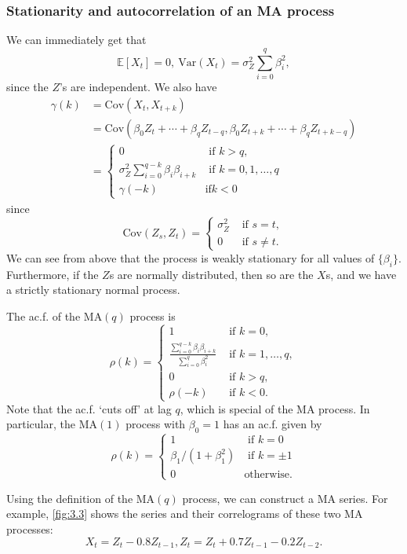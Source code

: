\subsubsection{Stationarity and autocorrelation of an MA process}
We can immediately get that 
\[ \mathbb{E}\left[ X_t \right] = 0, \ \mathrm{Var}(X_t) = \sigma_Z^2 \sum_{i = 0}^{q}\beta_i^2, \]
since the $Z$'s are independent. We also have 
\begin{align*}
	\gamma(k) 
	&= \mathrm{Cov}(X_t, X_{t+k}) \\
	&= \mathrm{Cov}(\beta_0Z_t + \cdots + \beta_q Z_{t-q}, \beta_0Z_{t+k} + \cdots + \beta_qZ_{t+k-q}) \\
	&= \begin{cases}
		0 &\text{ if } k > q, \\
		\sigma_Z^2 \sum_{i = 0}^{q - k} \beta_i \beta_{i+k} &\text{ if } k = 0, 1, \dots, q \\
		\gamma(-k) &\text{if} k < 0
	\end{cases}
\end{align*}
since 
\[ \mathrm{Cov}(Z_s, Z_t) = \begin{cases}
	\sigma_Z^2 &\text{ if } s = t, \\
	0 &\text{ if } s \neq t.
\end{cases} \]
We can see from above that the process is weakly stationary for all values of $\{ \beta_i \}$. Furthermore, if 
the $Z$s are normally distributed, then so are the $X$s, and we have a strictly stationary normal process.

The ac.f. of the $\mathrm{MA}(q)$ process is 
\[ \rho(k) = \begin{cases}
	1 &\text{ if } k = 0, \\
	\frac{\sum_{i = 0}^{q-k}\beta_i \beta_{i+k}}{\sum_{i = 0}^{q}\beta_i^2} &\text{ if } k = 1, \dots, q, \\
	0 &\text{ if } k > q, \\
	\rho(-k) &\text{ if } k < 0.
\end{cases} \]
Note that the ac.f. `cuts off' at lag $q$, which is special of the MA process. In particular, the 
$\mathrm{MA}(1)$ process with $\beta_0 = 1$ has an ac.f. given by 
\[ \rho(k) = \begin{cases}
	1 &\text{ if } k = 0 \\
	\beta_1 / (1 + \beta_1^2) &\text{ if } k = \pm 1 \\
	0 &\text{otherwise.}
\end{cases} \]

Using the definition of the $\mathrm{MA}(q)$ process, we can construct a MA series. For example, \cref{fig:3.3} 
shows the series and their correlograms of these two MA processes:
\[ X_t = Z_t - 0.8Z_{t-1}, Z_t = Z_t + 0.7Z_{t-1} - 0.2Z_{t-2}. \]

